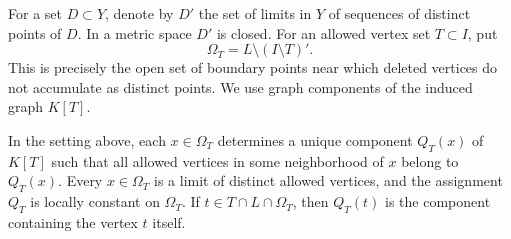 For a set $D\subset Y$, denote by $D'$ the set of limits in $Y$ of
sequences of distinct points of $D$. In a metric space $D'$ is closed.
For an allowed vertex set $T\subset I$, put
\[
  \Omega_T=L\setminus(I\setminus T)'.
\]
This is precisely the open set of boundary points near which deleted
vertices do not accumulate as distinct points. We use graph components
of the induced graph $K[T]$.

\begin{lemma}\label{ann:component}
In the setting above, each $x\in\Omega_T$ determines a unique component
$Q_T(x)$ of $K[T]$ such that all allowed vertices in some neighborhood
of $x$ belong to $Q_T(x)$. Every $x\in\Omega_T$ is a limit of distinct
allowed vertices, and the assignment $Q_T$ is locally constant on
$\Omega_T$. If $t\in T\cap L\cap\Omega_T$, then $Q_T(t)$ is the
component containing the vertex $t$ itself.
\end{lemma}

